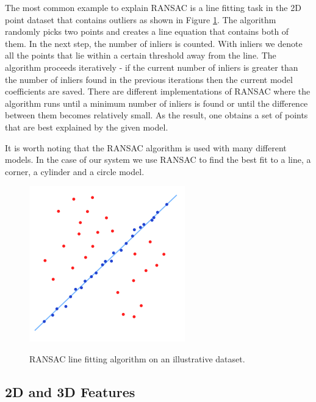 The most common example to explain RANSAC is a line fitting task in the 2D point dataset that contains outliers as shown in Figure \ref{fig:ransac}. The algorithm randomly picks two points and creates a line equation that contains both of them. In the next step, the number of inliers is counted. With inliers we denote all the points that lie within a certain threshold away from the line. The algorithm proceeds iteratively - if the current number of inliers is greater than the number of inliers found in the previous iterations then the current model coefficients are saved. There are different implementations of RANSAC where the algorithm runs until a minimum number of inliers is found or until the difference between them becomes relatively small. As the result, one obtains a set of points that are best explained by the given model.

It is worth noting that the RANSAC algorithm is used with many different models. In the case of our system we use RANSAC to find the best fit to a line, a corner, a cylinder and a circle model. 



\begin{figure}
\centering

{\includegraphics[width=0.3\columnwidth]{figures/ransac.png}}

\caption{RANSAC line fitting algorithm on an illustrative dataset.}
\label{fig:ransac}
\end{figure}



\subsection{2D and 3D Features}


